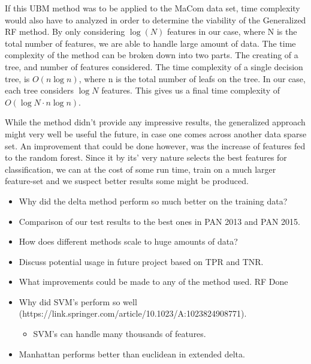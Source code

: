If this \gls{UBM} method was to be applied to the MaCom data set, 
time complexity would also have to analyzed in order to determine the viability
of the Generalized RF method. By only considering $\log(N)$ features in
our case, where N is the total number of features, we are able to handle
large amount of data. The time complexity of the method can be broken down
into two parts. The creating of a tree, and number of features considered.
The time complexity of a single decision tree, is $O(n \log{n})$, where n
is the total number of leafs on the tree. In our case, each tree considers
$\log{N}$ features. This gives us a final time complexity of $O(\log{N} \cdot n
\log{n})$.\cite{RFTime}

While the method didn't provide any impressive results, the generalized approach
might very well be useful the future, in case one comes across another data
sparse set. An improvement that could be done however, was the increase of 
features fed to the random forest. Since it by its' very nature
selects the best features for classification, we can at the cost of 
some run time, train on a much larger feature-set and we suspect better results
some might be produced.


\begin{itemize}
    \item Why did the delta method perform so much better on the training data?
    \item Comparison of our test results to the best ones in PAN 2013 and PAN
        2015.
    \item How does different methods scale to huge amounts of data?
    \item Discuss potential usage in future project based on TPR and TNR.
    \item What improvements could be made to any of the method used. RF Done
    \item Why did SVM's perform so well (https://link.springer.com/article/10.1023/A:1023824908771).
        \begin{itemize}
            \item SVM's can handle many thousands of features.
        \end{itemize}
    \item Manhattan performs better than euclidean in extended delta.
\end{itemize}
